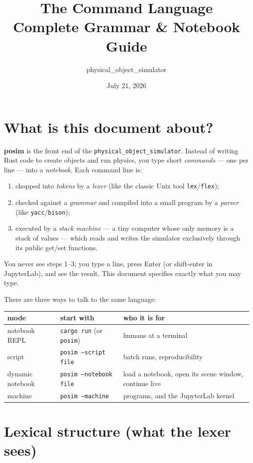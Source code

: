 \documentclass[11pt]{article}
\title{The \code{posim} Command Language\\[2pt]
       \large Complete Grammar \& Notebook Guide}
\author{physical\_object\_simulator}
\date{July 21, 2026}
\newcommand{\code}[1]{\texttt{#1}}
\begin{document}
\maketitle
\tableofcontents

\section{What is this document about?}

\textbf{posim} is the front end of the \code{physical\_object\_simulator}.
Instead of writing Rust code to create objects and run physics, you type
short \emph{commands} --- one per line --- into a \emph{notebook}. Each
command line is:
\begin{enumerate}
\item chopped into \emph{tokens} by a \emph{lexer} (like the classic Unix
      tool \code{lex}/\code{flex});
\item checked against a \emph{grammar} and compiled into a small program
      by a \emph{parser} (like \code{yacc}/\code{bison});
\item executed by a \emph{stack machine} --- a tiny computer whose only
      memory is a stack of values --- which reads and writes the simulator
      exclusively through its public get/set functions.
\end{enumerate}
You never see steps 1--3; you type a line, press Enter (or shift-enter in
JupyterLab), and see the result. This document specifies exactly what you
may type.

There are three ways to talk to the same language:

\begin{center}
\begin{tabular}{lll}
\textbf{mode} & \textbf{start with} & \textbf{who it is for}\\\hline
notebook REPL & \code{cargo run} (or \code{posim}) & humans at a terminal\\
script        & \code{posim --script file}         & batch runs, reproducibility\\
dynamic notebook & \code{posim --notebook file}    & load a notebook, open its scene window, continue live\\
machine       & \code{posim --machine}             & programs, and the JupyterLab kernel\\
\end{tabular}
\end{center}

\section{Lexical structure (what the lexer sees)}
\end{document}
